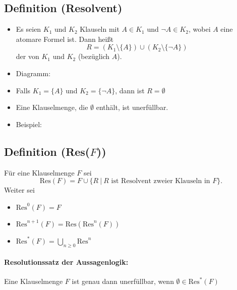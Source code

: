 \documentclass[a4paper]{scrartcl}
\begin{document}
\subsection{Definition (Resolvent)}
\begin{itemize}
\item Es seien $K_1$ und $K_2$ Klauseln mit $A\in K_1$ und $\neg A \in K_2$, 
    wobei $A$ eine atomare Formel ist. Dann heißt 
    $$ R=(K_1 \setminus \{A\}) \cup (K_2 \setminus \{\neg A\}) $$ der  von 
    $K_1$ und $K_2$ (bezüglich $A$).
\item Diagramm: \\

\item Falls $K_1 =\{A\}$ und $K_2=\{\neg A\}$, dann ist $R= \emptyset$
\item Eine Klauselmenge, die $\emptyset$ enthält, ist unerfüllbar. 
\item Beispiel:\\
\end{itemize}


\subsection{Definition (Res($F$))}
Für eine Klauselmenge $F$ sei
	$$ \mbox{Res}(F) = F\cup\{R\ |\ R \mbox{ ist Resolvent zweier Klauseln in $F$}\}.$$
Weiter sei
\begin{itemize}
\item $\mbox{Res}^0(F) = F$
\item $\mbox{Res}^{n+1}(F) = \mbox{Res}(\mbox{Res}^n(F))$
\item $\mbox{Res}^{\ast}(F) = \bigcup_{n\geq 0} \mbox{Res}^n$
\end{itemize} 

\paragraph{Resolutionssatz der Aussagenlogik:} Eine Klauselmenge $F$ ist genau dann
unerfüllbar, wenn $\emptyset \in \mbox{Res}^\ast (F)$
\end{document}
